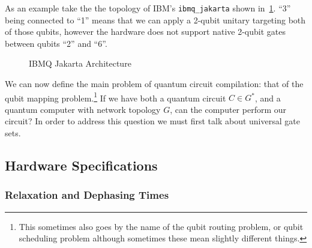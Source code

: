 As an example take the the topology of IBM's \texttt{ibmq\_jakarta} shown in~\ref{fig:ibm-jakarta}.
``3'' being connected to ``1'' means that we can apply a 2-qubit unitary targeting both of those qubits, however the hardware does not support native 2-qubit gates between qubits ``2'' and ``6''.
\begin{figure}[ht]
    \centering
    \caption{IBMQ Jakarta Architecture}\label{fig:ibm-jakarta}
\end{figure}

We can now define the main problem of quantum circuit compilation: that of the qubit mapping problem.\footnote{This sometimes also goes by the name of the qubit routing problem, or qubit scheduling problem although sometimes these mean slightly different things.}
If we have both a quantum circuit $C\in G^*$, and a quantum computer with network topology $G$, can the computer perform our circuit?
In order to address this question we must first talk about universal gate sets.


\subsection{Hardware Specifications}

\subsubsection{Relaxation and Dephasing Times}


